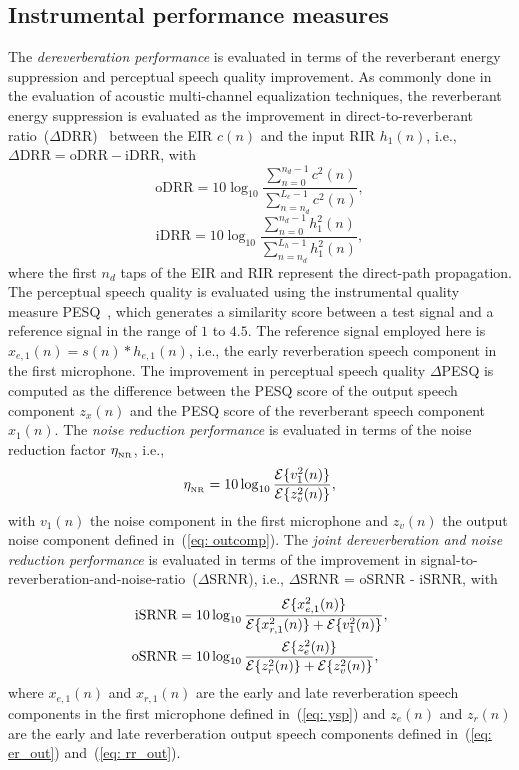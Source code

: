 \documentclass{aes60i}
\begin{document}
\subsection{Instrumental performance measures}

The \emph{dereverberation performance} is evaluated in terms of the reverberant energy suppression and perceptual speech quality improvement. 
As commonly done in the evaluation of acoustic multi-channel equalization techniques, the reverberant energy suppression is evaluated as the improvement in direct-to-reverberant ratio~($\Delta$DRR)~\cite{Naylor_Derev_book} between the EIR $c(n)$ and the input RIR $h_1(n)$, i.e., $\Delta {\text{DRR}} = {\text{oDRR}} - {\text{iDRR}}$, with
\begin{equation}
{\text{oDRR}}= 10 \log_{10} \frac{\sum\limits_{n=0}^{n_d-1} c^2(n)}{\sum\limits_{n=n_d}^{L_c-1} c^2(n)}, 
\end{equation}
\begin{equation}
{\text{iDRR}} = 10 \log_{10} \frac{\sum\limits_{n=0}^{n_d-1} h_1^2(n)}{\sum\limits_{n=n_d}^{L_h-1} h_1^2(n)},
\end{equation}
where the first $n_d$ taps of the EIR and RIR represent the direct-path propagation.
The perceptual speech quality is evaluated using the instrumental quality measure PESQ~\cite{PESQ}, which generates a similarity score between a test signal and a reference signal in the range of $1$ to $4.5$. 
The reference signal employed here is $x_{e,1}(n) = s(n) \ast h_{e,1}(n)$, i.e., the early reverberation speech component in the first microphone. 
The improvement in perceptual speech quality $\Delta$PESQ is computed as the difference between the PESQ score of the output speech component $z_x(n)$ and the PESQ score of the reverberant speech component $x_1(n)$.
\newline
The \emph{noise reduction performance} is evaluated in terms of the noise reduction factor $\eta_{_{\rm NR}}$, i.e., 
\begin{equation}
\eta_{_{\rm NR}} = 10 \log_{10} \frac{{\cal{E}} \{v_1^2(n)\}}{{\cal{E}} \{z_v^2(n)\}},
\end{equation}
with $v_1(n)$ the noise component in the first microphone and $z_v(n)$ the output noise component defined in~(\ref{eq: outcomp}).
\newline
The \emph{joint dereverberation and noise reduction performance} is evaluated in terms of the improvement in signal-to-reverberation-and-noise-ratio~($\Delta$SRNR), i.e., $\Delta$SRNR = oSRNR - iSRNR, with 
\begin{align}
{\text{iSRNR}} &= 10 \log_{10} \frac{{\cal{E}} \{x_{e,1}^2(n)\}}{{\cal{E}} \{x_{r,1}^2(n)\} + {\cal{E}} \{v_1^2(n)\}}, \\
{\text{oSRNR}} &= 10 \log_{10} \frac{{\cal{E}} \{z_{e}^2(n)\}}{{\cal{E}} \{z_{r}^2(n)\} + {\cal{E}} \{z_v^2(n)\}},
\end{align}
where $x_{e,1}(n)$ and $x_{r,1}(n)$ are the early and late reverberation speech components in the first microphone defined in~(\ref{eq: ysp}) and $z_e(n)$ and $z_r(n)$ are the early and late reverberation output speech components defined in~(\ref{eq: er_out}) and~(\ref{eq: rr_out}).
\end{document}
